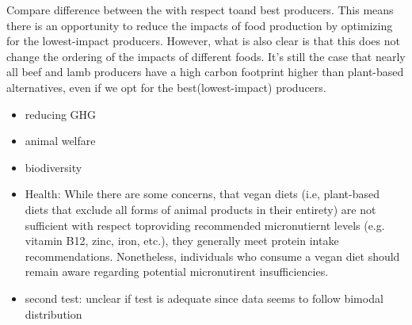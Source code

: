 \documentclass{article}
\begin{document}
Compare difference between the with respect toand best producers. This means there is an opportunity to reduce the impacts of food production by optimizing for the lowest-impact producers. However, what is also clear is that this does not change the ordering of the impacts of different foods. It's still the case that nearly all beef and lamb producers have a high carbon footprint higher than plant-based alternatives, even if we opt for the best(lowest-impact) producers.
\begin{itemize}
  \item reducing GHG
  \item animal welfare
  \item biodiversity
  \item Health: While there are some concerns, that vegan diets (i.e, plant-based diets that exclude all forms of animal products in their entirety) are not sufficient with respect toproviding recommended micronutiernt levels (e.g. vitamin B12, zinc, iron, etc.), they generally meet protein intake recommendations. Nonetheless, individuals who consume a vegan diet should remain aware regarding potential micronutirent insufficiencies. 
  \item second test: unclear if test is adequate since data seems to follow bimodal distribution
  \end{itemize}
  
{\small


}
\end{document}

